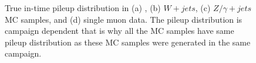 \begin{figure}
  \vfil 
\caption{ True in-time pileup distribution in (a) \ttjets, (b) $W + jets$,
        (c) $Z/\gamma + jets$ MC samples, and (d) single muon data. The pileup distribution
        is campaign dependent that is why all the MC samples have same pileup distribution as 
    these MC samples were generated in the same campaign.}
\label{fig:mcPileup} 
\end{figure}

